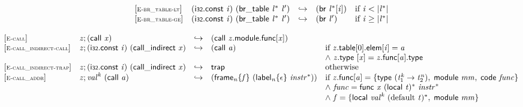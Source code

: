 \vspace{1ex}

$$
\begin{array}{@{}l@{}lcl@{}l@{}}
{[\textsc{\scriptsize E{-}br\_table{-}lt}]} \quad & (\mathsf{i{\scriptstyle32}}.\mathsf{const}~{\mathit{i}})~(\mathsf{br\_table}~{{\mathit{l}}^\ast}~{\mathit{l}'}) &\hookrightarrow& (\mathsf{br}~{{\mathit{l}}^\ast}[{\mathit{i}}]) &\quad
  \mbox{if}~{\mathit{i}} < {|{{\mathit{l}}^\ast}|} \\
{[\textsc{\scriptsize E{-}br\_table{-}ge}]} \quad & (\mathsf{i{\scriptstyle32}}.\mathsf{const}~{\mathit{i}})~(\mathsf{br\_table}~{{\mathit{l}}^\ast}~{\mathit{l}'}) &\hookrightarrow& (\mathsf{br}~{\mathit{l}'}) &\quad
  \mbox{if}~{\mathit{i}} \geq {|{{\mathit{l}}^\ast}|} \\
\end{array}
$$

\vspace{1ex}

$$
\begin{array}{@{}l@{}lcl@{}l@{}}
{[\textsc{\scriptsize E{-}call}]} \quad & {\mathit{z}} ; (\mathsf{call}~{\mathit{x}}) &\hookrightarrow& (\mathsf{call}~{\mathit{z}}.\mathsf{module}.\mathsf{func}[{\mathit{x}}]) &  \\
{[\textsc{\scriptsize E{-}call\_indirect{-}call}]} \quad & {\mathit{z}} ; (\mathsf{i{\scriptstyle32}}.\mathsf{const}~{\mathit{i}})~(\mathsf{call\_indirect}~{\mathit{x}}) &\hookrightarrow& (\mathsf{call}~{\mathit{a}}) &\quad
  \mbox{if}~{{\mathit{z}}.\mathsf{table}}{[0]}.\mathsf{elem}[{\mathit{i}}] = {\mathit{a}} \\
 &&&&\quad {\land}~{\mathit{z}}.\mathsf{type}~[{\mathit{x}}] = {\mathit{z}}.\mathsf{func}[{\mathit{a}}].\mathsf{type} \\
{[\textsc{\scriptsize E{-}call\_indirect{-}trap}]} \quad & {\mathit{z}} ; (\mathsf{i{\scriptstyle32}}.\mathsf{const}~{\mathit{i}})~(\mathsf{call\_indirect}~{\mathit{x}}) &\hookrightarrow& \mathsf{trap} &\quad
  \mbox{otherwise} \\
{[\textsc{\scriptsize E{-}call\_addr}]} \quad & {\mathit{z}} ; {{\mathit{val}}^{{\mathit{k}}}}~(\mathsf{call}~{\mathit{a}}) &\hookrightarrow& ({{\mathsf{frame}}_{{\mathit{n}}}}{\{{\mathit{f}}\}}~({{\mathsf{label}}_{{\mathit{n}}}}{\{\epsilon\}}~{{\mathit{instr}}^\ast})) &\quad
  \mbox{if}~{\mathit{z}}.\mathsf{func}[{\mathit{a}}] = \{ \begin{array}[t]{@{}l@{}}
\mathsf{type}~({{\mathit{t}}_{{1}}^{{\mathit{k}}}} \rightarrow {{\mathit{t}}_{{2}}^{{\mathit{n}}}}),\; \mathsf{module}~{\mathit{mm}},\; \mathsf{code}~{\mathit{func}} \}\end{array} \\
 &&&&\quad {\land}~{\mathit{func}} = \mathsf{func}~{\mathit{x}}~{(\mathsf{local}~{\mathit{t}})^\ast}~{{\mathit{instr}}^\ast} \\
 &&&&\quad {\land}~{\mathit{f}} = \{ \begin{array}[t]{@{}l@{}}
\mathsf{local}~{{\mathit{val}}^{{\mathit{k}}}}~{({\mathrm{default}}~{\mathit{t}})^\ast},\; \mathsf{module}~{\mathit{mm}} \}\end{array} \\
\end{array}
$$

